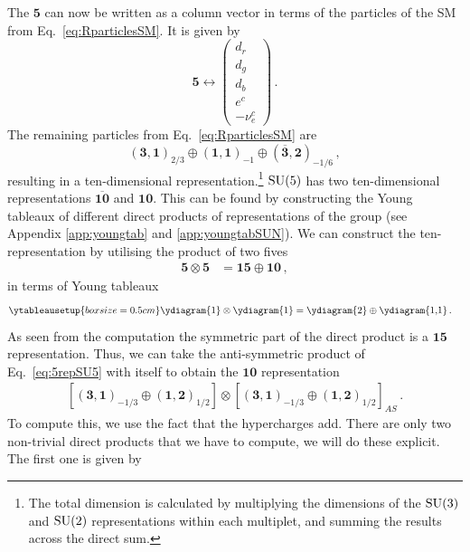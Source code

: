 The $\mathbf{5}$ can now be written as a column vector in terms of the particles of the SM from Eq.~\eqref{eq:RparticlesSM}. It is given by
\begin{equation}
    \mathbf{5}\leftrightarrow \begin{pmatrix}
        d_r\\d_g\\d_b\\e ^c\\-\nu_e^c 
    \end{pmatrix}\,. \label{eq:5rep}
\end{equation}
The remaining particles from Eq.~\eqref{eq:RparticlesSM} are 
\begin{equation}
     (\mathbf{3},\mathbf{1})_{2/3} \oplus (\mathbf{1},\mathbf{1})_{-1} \oplus (\overline{\mathbf{3}},\mathbf{2})_{-1/6} \,,
     \label{eq:5repSU5}
\end{equation}
resulting in a ten-dimensional representation.\footnote{The total dimension is calculated by multiplying the dimensions of the $\mathrm{SU}(3)$ and $\mathrm{SU}(2)$ representations within each multiplet, and summing the results across the direct sum.} $\mathrm{SU}(5)$ has two ten-dimensional representations $\overline{\mathbf{10}}$ and $\mathbf{10}$. This can be found by constructing the Young tableaux of different direct products of representations of the group (see Appendix \ref{app:youngtab} and \ref{app:youngtabSUN}). We can construct the ten-representation by utilising the product of two fives
\begin{align}
    \mathbf{5} \otimes \mathbf{5} &= \mathbf{15} \oplus \mathbf{10} \,, 
\end{align}
in terms of Young tableaux
\begin{align}
    \ytableausetup{boxsize=0.5cm}
    \vcenter{\hbox{\ydiagram{1}}} \otimes \vcenter{\hbox{\ydiagram{1}}} &= \vcenter{\hbox{\ydiagram{2}}} \oplus \vcenter{\hbox{\ydiagram{1,1}}}\,.
\end{align}
As seen from the computation the symmetric part of the direct product is a $\mathbf{15}$ representation. Thus, we can take the anti-symmetric product of Eq.~\eqref{eq:5repSU5} with itself to obtain the $\mathbf{10}$ representation 
\begin{align}
    \left[(\mathbf{3},\mathbf{1})_{-1/3}\oplus(\mathbf{1},\mathbf{2})_{1/2}\right]\otimes \left[(\mathbf{3},\mathbf{1})_{-1/3}\oplus(\mathbf{1},\mathbf{2})_{1/2}\right]_{AS}\,.\label{eq:irreps10}
\end{align}
To compute this, we use the fact that the hypercharges add. There are only two non-trivial direct products that we have to compute, we will do these explicit. The first one is given by
